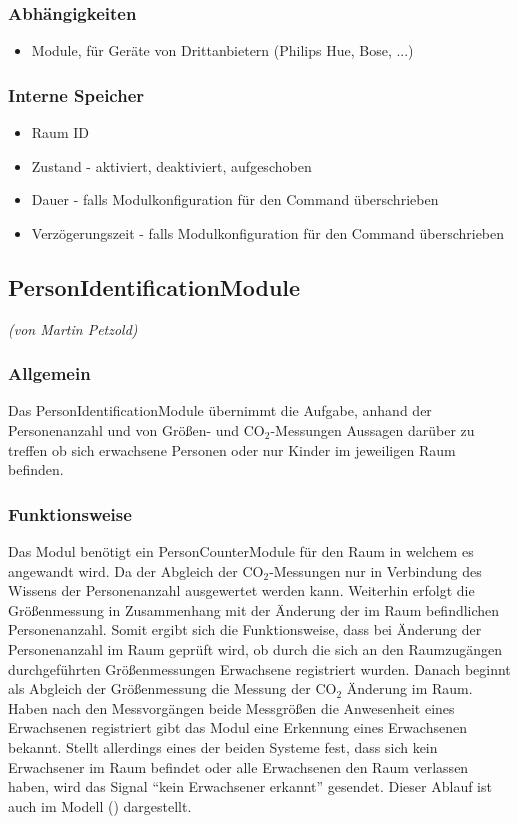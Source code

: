 \subsubsection{Abhängigkeiten}
\begin{itemize}
	\item Module, für Geräte von Drittanbietern (Philips Hue, Bose, ...)
\end{itemize}

\subsubsection{Interne Speicher}
\begin{itemize}
	\item Raum ID
	\item Zustand - aktiviert, deaktiviert, aufgeschoben
	\item Dauer - falls Modulkonfiguration für den Command überschrieben
	\item Verzögerungszeit - falls Modulkonfiguration für den Command überschrieben
	
\end{itemize}


\subsection{PersonIdentificationModule}
\emph{(von Martin Petzold)}

\subsubsection{Allgemein}
Das PersonIdentificationModule übernimmt die Aufgabe, anhand der Personenanzahl und von Größen- und CO$_2$-Messungen Aussagen darüber zu treffen ob sich erwachsene Personen oder nur Kinder im  jeweiligen Raum befinden. 

\subsubsection{Funktionsweise}
Das Modul benötigt ein PersonCounterModule für den Raum in welchem es angewandt wird. Da der Abgleich der CO$_2$-Messungen nur in Verbindung des Wissens der Personenanzahl ausgewertet werden kann. Weiterhin erfolgt die Größenmessung in Zusammenhang mit der Änderung der im Raum befindlichen Personenanzahl. Somit ergibt sich die Funktionsweise, dass bei Änderung der Personenanzahl im Raum geprüft wird, ob durch die sich an den Raumzugängen durchgeführten Größenmessungen Erwachsene registriert wurden. Danach beginnt als Abgleich der Größenmessung die Messung der CO$_2$ Änderung im Raum. Haben nach den Messvorgängen beide Messgrößen die Anwesenheit eines Erwachsenen registriert gibt das Modul eine Erkennung eines Erwachsenen bekannt. Stellt  allerdings eines der beiden Systeme fest, dass sich kein Erwachsener im Raum befindet oder alle Erwachsenen den Raum verlassen haben, wird das Signal "`kein Erwachsener erkannt"' gesendet. Dieser Ablauf ist auch im Modell () dargestellt.


